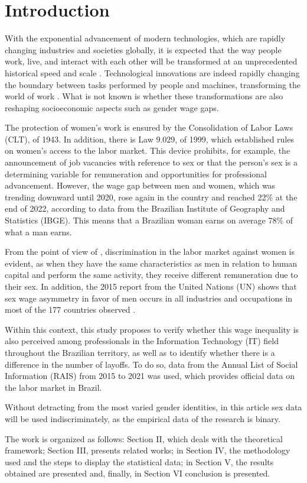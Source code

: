 \section{Introduction}

With the exponential advancement of modern technologies, which are rapidly changing industries and societies globally, it is expected that the way people work, live, and interact with each other will be transformed at an unprecedented historical speed and scale \cite{hand1981artificial}. Technological innovations are indeed rapidly changing the boundary between tasks performed by people and machines, transforming the world of work \cite{aksoy2021robots}. What is not known is whether these transformations are also reshaping socioeconomic aspects such as gender wage gaps.

The protection of women’s work is ensured by the Consolidation of Labor Laws (CLT), of 1943. In addition, there is Law 9.029, of 1999, which established rules on women’s access to the labor market. This device prohibits, for example, the announcement of job vacancies with reference to sex or that the person’s sex is a determining variable for remuneration and opportunities for professional advancement. However, the wage gap between men and women, which was trending downward until 2020, rose again in the country and reached 22\% at the end of 2022, according to data from the Brazilian Institute of Geography and Statistics (IBGE). This means that a Brazilian woman earns on average 78\% of what a man earns.

From the point of view of \cite{ahmed2015human}, discrimination in the labor market against women is evident, as when they have the same characteristics as men in relation to human capital and perform the same activity, they receive different remuneration due to their sex. In addition, the 2015 report from the United Nations (UN) shows that sex wage asymmetry in favor of men occurs in all industries and occupations in most of the 177 countries observed \cite{report2015onu}.

Within this context, this study proposes to verify whether this wage inequality is also perceived among professionals in the Information Technology (IT) field throughout the Brazilian territory, as well as to identify whether there is a difference in the number of layoffs. To do so, data from the Annual List of Social Information (RAIS) from 2015 to 2021 was used, which provides official data on the labor market in Brazil. 

Without detracting from the most varied gender identities, in this article sex data will be used indiscriminately, as the empirical data of the research is binary.

The work is organized as follows: Section II, which deals with the theoretical framework; Section III, presents related works; in Section IV, the methodology used and the steps to display the statistical data; in Section V, the results obtained are presented and, finally, in Section VI conclusion is presented.